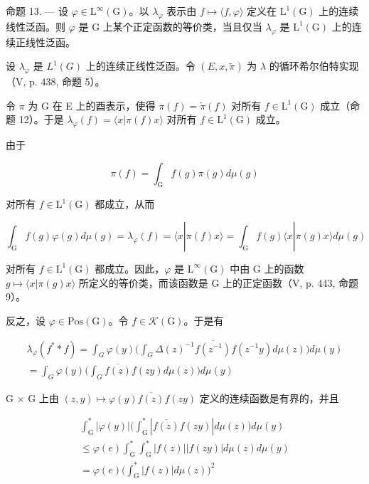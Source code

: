 命题 13. --- 设 \(\varphi\in\mathrm{L}^{\infty}(\mathrm{G})\)。以 \(\lambda_{\varphi}\) 表示由 \(f\mapsto\langle f,\varphi\rangle\) 定义在 \(\mathrm{L}^{1}(\mathrm{G})\) 上的连续线性泛函。则 \(\varphi\) 是 G 上某个正定函数的等价类，当且仅当 \(\lambda_{\varphi}\) 是 \(\mathrm{L}^{1}(\mathrm{G})\) 上的连续正线性泛函。

设 \(\lambda_{\varphi}\) 是 \(L^{1}(G)\) 上的连续正线性泛函。令 \((E, x, \widetilde{\pi})\) 为 \(\lambda\) 的循环希尔伯特实现（V, p. 438, 命题 5）。

令 \(\pi\) 为 G 在 E 上的酉表示，使得 \(\pi(f) = \widetilde{\pi}(f)\) 对所有 \(f \in \mathrm{L}^1(\mathrm{G})\) 成立（命题 12）。于是 \(\lambda_{\varphi}(f) = \langle x | \pi(f)x \rangle\) 对所有 \(f \in \mathrm{L}^1(\mathrm{G})\) 成立。

由于

\[
\pi (f) = \int_ {\mathrm{G}} f (g) \pi (g) d \mu (g)
\]

对所有 \(f\in \mathrm{L}^1 (\mathrm{G})\) 都成立，从而

\[
\int_ {\mathrm{G}} f (g) \varphi (g) d \mu (g) = \lambda_ {\varphi} (f) = \langle x | \pi (f) x \rangle = \int_ {\mathrm{G}} f (g) \langle x | \pi (g) x \rangle d \mu (g)
\]

对所有 \(f \in \mathrm{L}^{1}(\mathrm{G})\) 都成立。因此，\(\varphi\) 是 \(\mathrm{L}^{\infty}(\mathrm{G})\) 中由 G 上的函数 \(g \mapsto \langle x | \pi(g)x \rangle\) 所定义的等价类，而该函数是 G 上的正定函数（V, p. 443, 命题 9）。

反之，设 \(\varphi\in\mathrm{Pos}(\mathrm{G})\)。令 \(f\in\mathcal{K}(\mathrm{G})\)。于是有

\[
\begin{array}{c} \lambda_ {\varphi} (f ^ {*} * f) = \int_ {G} \varphi (y) \Big (\int_ {G} \Delta (z) ^ {- 1} \overline {{f (z ^ {- 1})}} f (z ^ {- 1} y) d \mu (z) \Big) d \mu (y) \\ = \int_ {G} \varphi (y) \Big (\int_ {G} \overline {{f (z)}} f (z y) d \mu (z) \Big) d \mu (y) \end{array}
\]

G × G 上由 \((z, y) \mapsto \varphi(y)\overline{f(z)}f(zy)\) 定义的连续函数是有界的，并且

\[
\begin{array}{c} \int_ {\mathrm{G}} ^ {*} | \varphi (y) | \Big (\int_ {\mathrm{G}} ^ {*} | \overline {{f (z)}} f (z y) | d \mu (z) \Big) d \mu (y) \\ \leqslant \varphi (e) \int_ {\mathrm{G}} ^ {*} \int_ {\mathrm{G}} ^ {*} | f (z) | | f (z y) | d \mu (z) d \mu (y) \\ = \varphi (e) \Big (\int_ {\mathrm{G}} ^ {*} | f (z) | d \mu (z) \Big) ^ {2} \end{array}
\]

